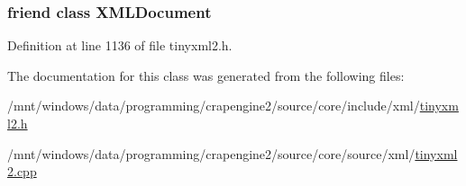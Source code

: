\hypertarget{classtinyxml2_1_1_x_m_l_element_a4eee3bda60c60a30e4e8cd4ea91c4c6e}{}
\subsubsection[{X\+M\+L\+Document}]{\setlength{\rightskip}{0pt plus 5cm}friend class {\bf X\+M\+L\+Document}\hspace{0.3cm}{\ttfamily [friend]}}\label{classtinyxml2_1_1_x_m_l_element_a4eee3bda60c60a30e4e8cd4ea91c4c6e}


Definition at line 1136 of file tinyxml2.\+h.



The documentation for this class was generated from the following files\+:\begin{DoxyCompactItemize}
\item 
/mnt/windows/data/programming/crapengine2/source/core/include/xml/\hyperlink{tinyxml2_8h}{tinyxml2.\+h}\item 
/mnt/windows/data/programming/crapengine2/source/core/source/xml/\hyperlink{tinyxml2_8cpp}{tinyxml2.\+cpp}\end{DoxyCompactItemize}
